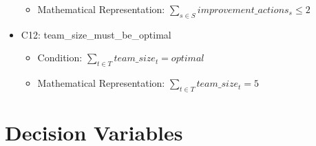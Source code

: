 \documentclass{article}
\begin{document}
\begin{itemize}
\begin{itemize}
            \item Mathematical Representation: $\sum_{s \in S} improvement\_actions_s \leq 2$
        \end{itemize}
    \item C12: team\_size\_must\_be\_optimal
        \begin{itemize}
            \item Condition: $\sum_{t \in T} team\_size_t = optimal$
            \item Mathematical Representation: $\sum_{t \in T} team\_size_t = 5$
        \end{itemize}
\end{itemize}

\section{Decision Variables}
\end{document}
